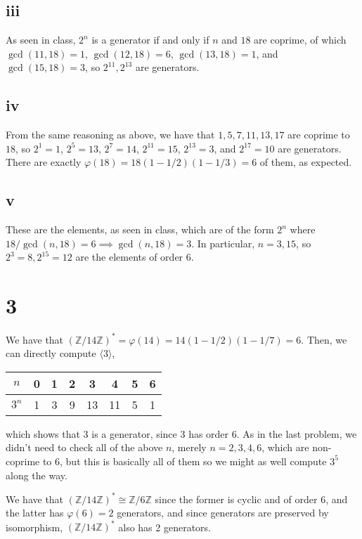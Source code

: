 \documentclass[12pt,letterpaper]{article}
\theoremstyle{definition}
\newcommand{\Z}{\mathbb{Z}}
\begin{document}
\subsection*{iii}

As seen in class, $2^{n}$ is a generator if and only if $n$ and $18$ are coprime, of which $\gcd(11,18) = 1$, $\gcd(12, 18) = 6$, $\gcd(13, 18) = 1$, and $\gcd(15,18) = 3$, so $2^{11}, 2^{13}$ are generators.

\subsection*{iv}

From the same reasoning as above, we have that $1,5,7,11,13,17$ are coprime to $18$, so $2^{1} = 1$, $2^{5} = 13$, $2^{7}=14$, $2^{11} = 15$, $2^{13} = 3$, and $2^{17} = 10$ are generators. There are exactly $\varphi(18) = 18(1 - 1/2)(1 - 1/3) = 6$ of them, as expected.

\subsection*{v}

These are the elements, as seen in class, which are of the form $2^{n}$ where $18/\gcd(n,18) = 6 \implies \gcd(n,18) = 3$. In particular, $n = 3, 15$, so $2^{3} = 8, 2^{15} = 12$ are the elements of order $6$.

\section*{3}

We have that $(\Z/14\Z)^{*} = \varphi(14) = 14(1 - 1/2)(1 - 1/7) = 6$. Then, we can directly compute $\langle 3 \rangle$,
\begin{center}
  \begin{tabular}{c|c|c|c|c|c|c|c}
    $n$ & 0 & 1 & 2 & 3 & 4 & 5 & 6 \\ \hline
    $3^{n}$ & 1 & 3 & 9 & 13 & 11 & 5 & 1
  \end{tabular}
\end{center}
which shows that $3$ is a generator, since $3$ has order $6$. As in the last problem, we didn't need to check all of the above $n$, merely $n = 2,3,4,6$, which are non-coprime to $6$, but this is basically all of them so we might as well compute $3^{5}$ along the way.

We have that $(\Z/14\Z)^{*} \cong \Z/6\Z$ since the former is cyclic and of order $6$, and the latter has $\varphi(6) = 2$ generators, and since generators are preserved by isomorphism, $(\Z/14\Z)^{*}$ also has 2 generators.
\end{document}
